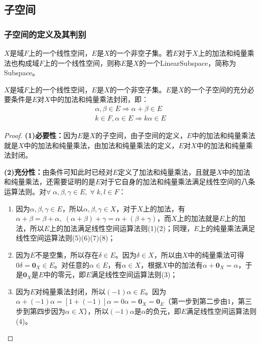 \subsection{子空间}
\subsubsection{子空间的定义及其判别}
\begin{definition}
	$X$是域$F$上的一个线性空间，$E$是$X$的一个非空子集。若$E$对于$X$上的加法和纯量乘法也构成域$F$上的一个线性空间，则称$E$是$X$的一个\gls{LinearSubspace}，简称为\gls{Subspace}。
\end{definition}
\begin{theorem}\label{theo:Subspace}
	$X$是域$F$上的一个线性空间，$E$是$X$的一个非空子集。$E$是$X$的一个子空间的充分必要条件是$E$对$X$中的加法和纯量乘法封闭，即：
	\begin{gather*}
		\alpha,\beta\in E\Rightarrow\alpha+\beta\in E \\
		k\in F,\alpha\in E\Rightarrow k\alpha\in E
	\end{gather*}
\end{theorem}
\begin{proof}
	\textbf{(1)必要性：}因为$E$是$X$的子空间，由子空间的定义，$E$中的加法和纯量乘法就是$X$中的加法和纯量乘法，由加法和纯量乘法的定义，$E$对$X$中的加法和纯量乘法封闭。\par
	\textbf{(2)充分性：}由条件可知此时已经对$E$定义了加法和纯量乘法，且就是$X$中的加法和纯量乘法，还需要证明的是$E$对于它自身的加法和纯量乘法满足线性空间的八条运算法则。对$\forall\;\alpha,\beta,\gamma\in E,\;\forall\;k,l\in F$：
	\begin{enumerate}
		\item 因为$\alpha,\beta,\gamma\in E$，所以$\alpha,\beta,\gamma\in X$，对于$X$上的加法，有$\alpha+\beta=\beta+\alpha,\;(\alpha+\beta)+\gamma=\alpha+(\beta+\gamma)$，而$X$上的加法就是$E$上的加法，所以$E$上的加法满足线性空间运算法则(1)(2)；同理，$E$上的纯量乘法满足线性空间运算法则(5)(6)(7)(8)；
		\item 因为$E$不是空集，所以存在$\delta\in E$。因为$\delta\in X$，所以由$X$中的纯量乘法可得$0\delta=\mathbf{0}_X\in E$。对任意的$\alpha\in E$，有$\alpha\in X$，根据$X$中的加法有$\alpha+\mathbf{0}_X=\alpha$，于是$\mathbf{0}_X$是$E$中的零元，即$E$满足线性空间运算法则(3)；
		\item 因为$E$对纯量乘法封闭，所以$(-1)\alpha\in E$。因为$\alpha+(-1)\alpha=[1+(-1)]\alpha=0\alpha=\mathbf{0}_X=\mathbf{0}_E$（第一步到第二步由$1$，第三步到第四步因为$\alpha\in X$），所以$(-1)\alpha$是$\alpha$的负元，即$E$满足线性空间运算法则(4)。
	\end{enumerate}
\end{proof}
